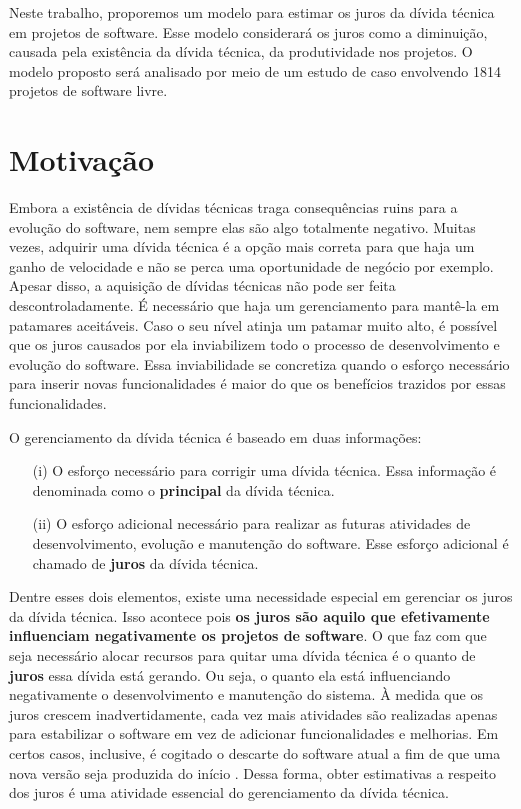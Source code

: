 Neste trabalho, proporemos um modelo para estimar os juros da dívida técnica em projetos de software. Esse modelo considerará os juros como a diminuição, causada pela existência da dívida técnica, da produtividade nos projetos. O modelo proposto será analisado por meio de um estudo de caso envolvendo 1814 projetos de software livre.


\section{Motivação}

Embora a existência de dívidas técnicas traga consequências ruins para a evolução do software, nem sempre elas são algo totalmente negativo. Muitas vezes, adquirir uma dívida técnica é a opção mais correta para que haja um ganho de velocidade e não se perca uma oportunidade de negócio por exemplo.  Apesar disso, a aquisição de dívidas técnicas não pode ser feita descontroladamente. É necessário que haja um gerenciamento para mantê-la em patamares aceitáveis.  Caso o seu nível atinja um patamar muito alto, é possível que os juros causados por ela inviabilizem todo o processo de desenvolvimento e evolução do software. Essa inviabilidade se concretiza quando o esforço necessário para inserir novas funcionalidades é maior do que os benefícios trazidos por essas funcionalidades.

O gerenciamento da dívida técnica é baseado em duas informações:
\begin{itemize}
\item[(i)] O esforço necessário para corrigir uma dívida técnica. Essa informação é denominada como o \textbf{principal} da dívida técnica.
\item[(ii)] O esforço adicional necessário para realizar as futuras atividades de desenvolvimento, evolução e manutenção do software.  Esse esforço adicional é chamado de \textbf{juros} da dívida técnica.
\end{itemize}

Dentre esses dois elementos, existe uma necessidade especial em gerenciar os juros da dívida técnica. Isso acontece pois \textbf{os juros são aquilo que efetivamente influenciam negativamente os projetos de software}.  O que faz com que seja necessário alocar recursos para quitar uma dívida técnica é o quanto de \textbf{juros} essa dívida está gerando.  Ou seja, o quanto ela está influenciando negativamente o desenvolvimento e manutenção do sistema.   À medida que os juros crescem inadvertidamente,  cada vez mais atividades são realizadas apenas para estabilizar o software em vez de adicionar funcionalidades e melhorias. Em certos casos, inclusive, é cogitado o descarte do software atual a fim de que uma nova versão seja produzida do início \cite{sterling2010managing}. Dessa forma, obter estimativas a respeito dos juros é uma atividade essencial do gerenciamento da dívida técnica. 

